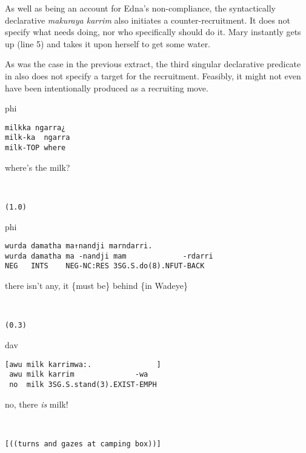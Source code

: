 \documentclass[output=paper,nonflat,colorlinks,citecolor=brown]{langsci/langscibook}
\begin{document}
As well as being an account for Edna’s non-compliance, the syntactically declarative \textit{makuraya karrim} also initiates a counter-recruitment. It does not specify what needs doing, nor who specifically should do it. Mary instantly gets up (line 5) and takes it upon herself to get some water.

As was the case in the previous extract, the third singular declarative predicate in  also does not specify a target for the recruitment. Feasibly, it might not even have been intentionally produced as a recruiting move.

\vspace{2mm}
%
\begin{transbox}{1}{phi}
\begin{verbatim}
milkka ngarra¿
milk-ka  ngarra
milk-TOP where
\end{verbatim}
where's the milk?
\end{transbox}
%
\begin{transbox}{2}{~}
\begin{verbatim}
(1.0)
\end{verbatim}
\end{transbox}
%
\begin{transbox}{3}{phi}
\begin{verbatim}
wurda damatha ma↑nandji marndarri.
wurda damatha ma -nandji mam             -rdarri
NEG   INTS    NEG-NC:RES 3SG.S.do(8).NFUT-BACK
\end{verbatim}
there isn't any, it \{must be\} behind \{in Wadeye\}
\end{transbox}
%
\begin{transbox}{4}{~}
\begin{verbatim}
(0.3)
\end{verbatim}
\end{transbox}
%
\begin{mdframednoverticalspace}[style=firstfoc]
\begin{transbox}{5}{dav}
\begin{verbatim}
[awu milk karrimwa:.               ]
 awu milk karrim              -wa
 no  milk 3SG.S.stand(3).EXIST-EMPH
\end{verbatim}
\hspace{0.07cm} no, there \textit{is} milk!
\end{transbox}\vspace{1mm}
%
\begin{transbox}{6}{~}
\begin{verbatim}
[((turns and gazes at camping box))]
\end{verbatim}
\end{transbox}
\end{mdframednoverticalspace}
\end{document}
